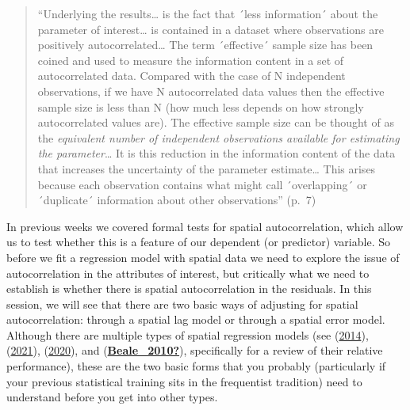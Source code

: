 \documentclass[
  krantz2]{krantz}
\begin{document}
\begin{quote}
``Underlying the results\ldots{} is the fact that ´less information´ about the parameter of interest\ldots{} is contained in a dataset where observations are positively autocorrelated\ldots{} The term ´effective´ sample size has been coined and used to measure the information content in a set of autocorrelated data. Compared with the case of N independent observations, if we have N autocorrelated data values then the effective sample size is less than N (how much less depends on how strongly autocorrelated values are). The effective sample size can be thought of as the \emph{equivalent number of independent observations available for estimating the parameter}\ldots{} It is this reduction in the information content of the data that increases the uncertainty of the parameter estimate\ldots{} This arises because each observation contains what might call ´overlapping´ or ´duplicate´ information about other observations'' (p.~7)
\end{quote}

In previous weeks we covered formal tests for spatial autocorrelation, which allow us to test whether this is a feature of our dependent (or predictor) variable. So before we fit a regression model with spatial data we need to explore the issue of autocorrelation in the attributes of interest, but critically what we need to establish is whether there is spatial autocorrelation in the residuals. In this session, we will see that there are two basic ways of adjusting for spatial autocorrelation: through a spatial lag model or through a spatial error model. Although there are multiple types of spatial regression models (see (\protect\hyperlink{ref-Anselin_2014}{2014}), (\protect\hyperlink{ref-Bivand_2021}{2021}), (\protect\hyperlink{ref-Chi_2020}{2020}), and (\protect\hyperlink{ref-Beale_2010}{\textbf{Beale\_2010?}}), specifically for a review of their relative performance), these are the two basic forms that you probably (particularly if your previous statistical training sits in the frequentist tradition) need to understand before you get into other types.
\end{document}
